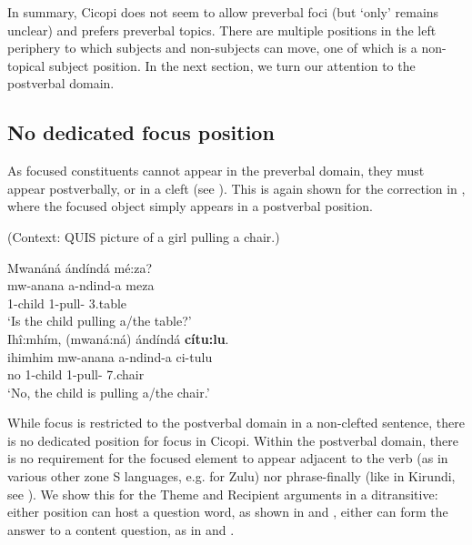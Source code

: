 \documentclass[output=paper]{langscibook}
\begin{document}
In summary, Cicopi does not seem to allow preverbal foci (but ‘only’ remains unclear) and prefers preverbal topics. There are multiple positions in the left periphery to which subjects and non-subjects can move, one of which is a non-topical subject position. In the next section, we turn our attention to the postverbal domain. 

\subsection{No dedicated focus position}
\label{bkm:Ref121988262}
As focused constituents cannot appear in the preverbal domain, they must appear postverbally, or in a cleft (see ). This is again shown for the correction in , where the focused object simply appears in a postverbal position.

\ea
(Context: QUIS picture of a girl pulling a chair.)\\
\begin{xlist}
\label{bkm:Ref146270704}
Mwanáná ándíndá mé:za?\\
\gll
mw-anana  a-ndind-a  meza\\
1-child  1\SM{}-pull-\FV{}  3.table\\
\glt
‘Is the child pulling a/the table?’\\

Ihî:mhím, (mwaná:ná) ándíndá \textbf{cítu:lu}.\\
\gll
ihimhim  mw-anana  a-ndind-a  ci-tulu\\
no  1-child  1\SM{}-pull-\FV{}  7.chair\\
\glt
‘No, the child is pulling a/the chair.’

\end{xlist}
\z

While focus is restricted to the postverbal domain in a non-clefted sentence, there is no dedicated position for focus in Cicopi. Within the postverbal domain, there is no requirement for the focused element to appear adjacent to the verb (as in various other zone S languages, e.g. \citealt{Buell2009} for Zulu) nor phrase-finally (like in Kirundi, see \cite{chapters/kirundi}). We show this for the Theme and Recipient arguments in a ditransitive: either position can host a question word, as shown in  and , either can form the answer to a content question, as in  and .
\end{document}
